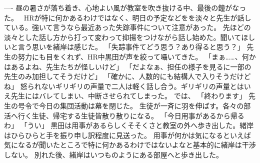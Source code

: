 \documentclass[uplatex]{utbook}
\begin{document}
----
昼の暑さが落ち着き、心地よい風が教室を吹き抜ける中、最後の鐘がなった。　
HRが特に何かあるわけではなく、明日の予定などをを淡々と先生が話している。強いて言うなら最近あった失踪事件について注意があった。
先ほどの淡々とした話し方から打って変わって抑揚をつけながら話し始めた。聞いてほしいと言う思いを緒岸は感じた。
「失踪事件てどう思う？あり得ると思う？」
先生の努力にも目をくれず、HR中黒田が声を絞って囁いてきた。
「まぁ……、何かはあるよね、先生たちが怪しいけど」
「だよなぁ、担任の様子を見るに一部の先生のみ加担してそうだけど」
「確かに、人数的にも結構人で入りそうだけどね」
怒られないギリギリの声量で二人は軽く話し合う。ギリギリの声量とはいえ先生にはバレてしまい、中断させられてしまった。
では、
「終わります」
先生の号令で今日の集団活動は幕を閉じた。
生徒が一斉に羽を伸ばす。各々の部活へ行く生徒、帰宅する生徒皆散り散りになる。
「今日用事があるから帰るわ」
「うい」
黒田は用事があるらしくそそくさと教室の外へ歩き出した。緒岸はひらひらと手を振り申し訳程度に見送った。
用事が何かは気になるといえば気になるが聞いたところで特に何かあるわけではないよなと基本的に緒岸は干渉しない。
別れた後、緒岸はいつものようにある部屋へと歩き出した。
\end{document}
